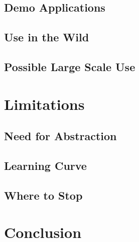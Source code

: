 \documentclass[12pt]{article}
\begin{document}
    \subsection{Demo Applications}
    
    \subsection{Use in the Wild}
    
    \subsection{Possible Large Scale Use}
    
  \section{Limitations}
    
    \subsection{Need for Abstraction}
    
    \subsection{Learning Curve}
    
    \subsection{Where to Stop}
    
  \section{Conclusion}
  
\end{document}
